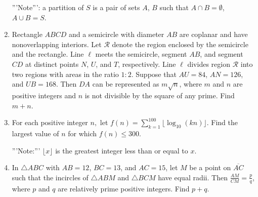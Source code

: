 \documentclass{article}
\begin{document}
\begin{enumerate}[label=\arabic*., itemsep=0.5em]
'''Note''': a partition of \(S\) is a pair of sets \(A\), \(B\) such that \(A \cap B = \emptyset\), \(A \cup B = S\).\par \vspace{0.5em}\item Rectangle \(ABCD\) and a semicircle with diameter \(AB\) are coplanar and have nonoverlapping interiors. Let \(\mathcal{R}\) denote the region enclosed by the semicircle and the rectangle. Line \(\ell\) meets the semicircle, segment \(AB\), and segment \(CD\) at distinct points \(N\), \(U\), and \(T\), respectively. Line \(\ell\) divides region \(\mathcal{R}\) into two regions with areas in the ratio \(1: 2\). Suppose that \(AU = 84\), \(AN = 126\), and \(UB = 168\). Then \(DA\) can be represented as \(m\sqrt {n}\), where \(m\) and \(n\) are positive integers and \(n\) is not divisible by the square of any prime. Find \(m + n\).\par \vspace{0.5em}\item For each positive integer \(n,\) let \(f(n) = \sum_{k = 1}^{100} \lfloor \log_{10} (kn) \rfloor\). Find the largest value of \(n\) for which \(f(n) \le 300\).

'''Note:''' \(\lfloor x \rfloor\) is the greatest integer less than or equal to \(x\).\par \vspace{0.5em}\item In \(\triangle{ABC}\) with \(AB = 12\), \(BC = 13\), and \(AC = 15\), let \(M\) be a point on \(\overline{AC}\) such that the incircles of \(\triangle{ABM}\) and \(\triangle{BCM}\) have equal radii. Then \(\frac{AM}{CM} = \frac{p}{q}\), where \(p\) and \(q\) are relatively prime positive integers. Find \(p + q\).\par \vspace{0.5em}
\end{enumerate}
\end{document}
